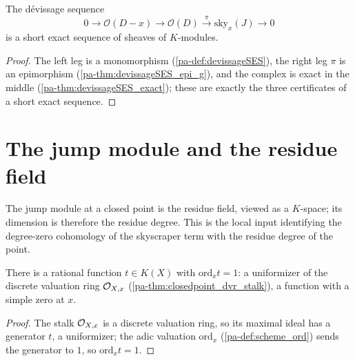 \begin{theorem}
  \label{pa-thm:devissageSES_shortExact}
  \leanok

  The dévissage sequence
  \[
    0 \longrightarrow \mathcal O(D-x) \longrightarrow \mathcal O(D)
      \xrightarrow{\ \pi\ } \mathrm{sky}_x(J) \longrightarrow 0
  \]
  is a short exact sequence of sheaves of \(K\)-modules.
\end{theorem}
\begin{proof}
  \leanok
  The left leg is a monomorphism (\ref{pa-def:devissageSES}), the right leg \(\pi\) is an epimorphism
  (\ref{pa-thm:devissageSES_epi_g}), and the complex is exact in the middle
  (\ref{pa-thm:devissageSES_exact}); these are exactly the three certificates of a short exact
  sequence.
\end{proof}

\section{The jump module and the residue field}

The jump module at a closed point is the residue field, viewed as a \(K\)-space; its dimension is
therefore the residue degree. This is the local input identifying the degree-zero cohomology of the
skyscraper term with the residue degree of the point.

\begin{lemma}
  \label{pa-lem:uniformizer}
  \leanok

  There is a rational function \(t \in K(X)\) with \(\mathrm{ord}_x t = 1\): a uniformizer of the
  discrete valuation ring \(\mathcal{O}_{X,x}\) (\ref{pa-thm:closedpoint_dvr_stalk}), a function with a
  simple zero at \(x\).
\end{lemma}
\begin{proof}
  \leanok
  The stalk \(\mathcal{O}_{X,x}\) is a discrete valuation ring, so its maximal ideal has a generator
  \(t\), a uniformizer; the adic valuation \(\mathrm{ord}_x\) (\ref{pa-def:scheme_ord}) sends the
  generator to \(1\), so \(\mathrm{ord}_x t = 1\).
\end{proof}

